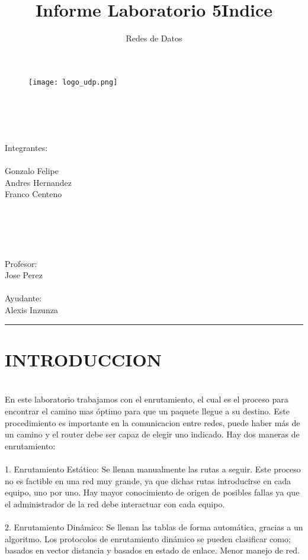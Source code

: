 \documentclass[onecolumn,12pt]{IEEEtran}
\begin{document}
\title{Informe Laboratorio 5}
\author{Redes de Datos}

\begin{figure}[h]
\texttt{[image: logo\_udp.png]}
\label{fig:mesh1}
\\
\\
\\
\\
\\
\maketitle
\end{figure}
\begin{center}
Integrantes:\\
\hfill \\
Gonzalo Felipe\\
Andres Hernandez\\
Franco Centeno\\
\hfill \\
\hfill \\
\hfill \\
\hfill \\
\ \hfill \\
Profesor:\\
Jose Perez\\ \hfill \\
Ayudante:\\
Alexis Inzunza\\
\end{center}

\newpage
\title{Indice}
\author{ }
\maketitle
\hrule
\tableofcontents

\newpage
\section{INTRODUCCION}
\hfill \\
En este laboratorio trabajamos con el enrutamiento, el cual es el proceso para encontrar el camino mas óptimo para que un paquete llegue a su destino. Este procedimiento es importante en la comunicacion entre redes, puede haber más de un camino y el router debe ser capaz de elegir uno indicado. Hay dos maneras de enrutamiento:\\ \\
1. Enrutamiento Estático: Se llenan manualmente las rutas a seguir. Este proceso no es factible en una red muy grande, ya que dichas rutas introducirse en cada equipo, uno por uno. Hay mayor conocimiento de origen de posibles fallas ya que el administrador de la red debe interactuar con cada equipo.\\ \\
2. Enrutamiento Dinámico: Se llenan las tablas de forma automática, gracias a un algoritmo. Los protocolos de enrutamiento
dinámico se pueden clasificar como; basados en vector distancia y basados en estado de enlace. Menor manejo de red.
\end{document}
